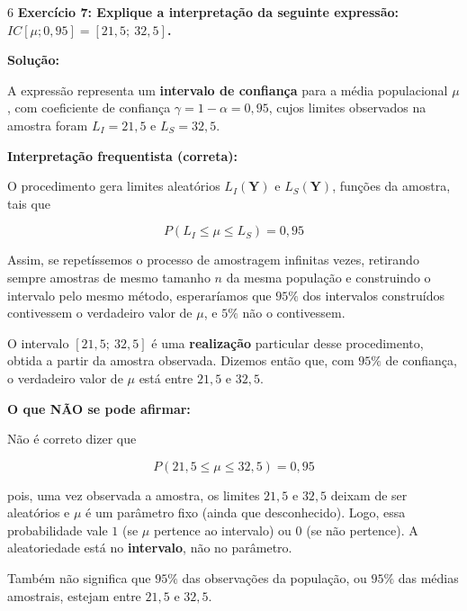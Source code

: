 \documentclass[8pt, a4paper, landscape]{extarticle}
\begin{document}
\begin{multicols}{6}
\textbf{Exercício 7: Explique a interpretação da seguinte expressão: $IC[\mu;0,95] = [21,5;\ 32,5]$.}

\vspace{0.3cm}

\textbf{Solução:}

A expressão representa um \textbf{intervalo de confiança} para a média populacional $\mu$, com coeficiente de confiança $\gamma = 1 - \alpha = 0,95$, cujos limites observados na amostra foram $L_I = 21,5$ e $L_S = 32,5$.

\vspace{0.2cm}

\textbf{Interpretação frequentista (correta):}

O procedimento gera limites aleatórios $L_I(\mathbf{Y})$ e $L_S(\mathbf{Y})$, funções da amostra, tais que

\begin{equation*}
P\left(L_I \leq \mu \leq L_S\right) = 0,95
\end{equation*}

Assim, se repetíssemos o processo de amostragem infinitas vezes, retirando sempre amostras de mesmo tamanho $n$ da mesma população e construindo o intervalo pelo mesmo método, esperaríamos que $95\%$ dos intervalos construídos contivessem o verdadeiro valor de $\mu$, e $5\%$ não o contivessem.

O intervalo $[21,5;\ 32,5]$ é uma \textbf{realização} particular desse procedimento, obtida a partir da amostra observada. Dizemos então que, com $95\%$ de confiança, o verdadeiro valor de $\mu$ está entre $21,5$ e $32,5$.

\vspace{0.2cm}

\textbf{O que NÃO se pode afirmar:}

Não é correto dizer que

\begin{equation*}
P\left(21,5 \leq \mu \leq 32,5\right) = 0,95
\end{equation*}

pois, uma vez observada a amostra, os limites $21,5$ e $32,5$ deixam de ser aleatórios e $\mu$ é um parâmetro fixo (ainda que desconhecido). Logo, essa probabilidade vale $1$ (se $\mu$ pertence ao intervalo) ou $0$ (se não pertence). A aleatoriedade está no \textbf{intervalo}, não no parâmetro.

Também não significa que $95\%$ das observações da população, ou $95\%$ das médias amostrais, estejam entre $21,5$ e $32,5$.


\end{multicols}
\end{document}
